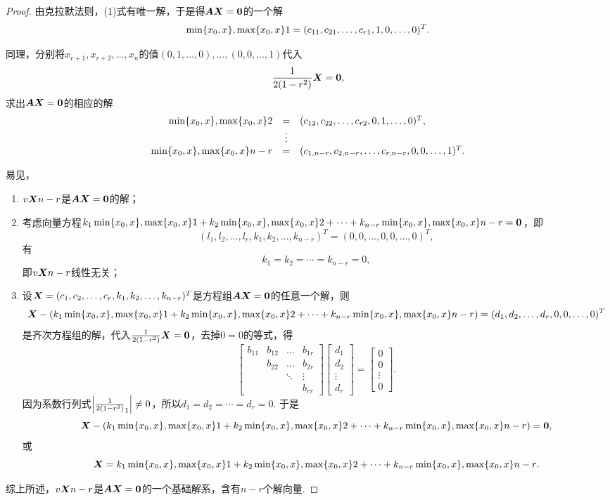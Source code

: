 \begin{theorem}
\begin{proof}
由克拉默法则，(1)式有唯一解，于是得\(\A\x=\z\)的一个解\[
\X1 = (c_{11},c_{21},\dotsc,c_{r1},1,0,\dotsc,0)^T.
\]

同理，分别将\(x_{r+1},x_{r+2},\dotsc,x_n\)的值\((0,1,\dotsc,0),\dotsc,(0,0,\dotsc,1)\)代入\[
\B \x = \z,
\]求出\(\A\x=\z\)的相应的解\[
\begin{array}{rcl}
\X2 &=& (c_{12},c_{22},\dotsc,c_{r2},0,1,\dotsc,0)^T, \\
&\vdots& \\
\X{n-r} &=& (c_{1,n-r},c_{2,n-r},\dotsc,c_{r,n-r},0,0,\dotsc,1)^T.
\end{array}
\]

易见，\begin{enumerate}
\item \(\v{\x}{n-r}\)是\(\A\x=\z\)的解；

\item 考虑向量方程\(k_1 \X1 + k_2 \X2 + \dotsb + k_{n-r} \X{n-r} = \z\)，即\[
(l_1,l_2,\dotsc,l_r,k_1,k_2,\dotsc,k_{n-r})^T
= (0,0,\dotsc,0,0,\dotsc,0)^T,
\]有\[
k_1 = k_2 = \dotsb = k_{n-r} = 0,
\]即\(\v{\x}{n-r}\)线性无关；

\item 设\(\x = (c_1,c_2,\dotsc,c_r,k_1,k_2,\dotsc,k_{n-r})^T\)是方程组\(\A\x=\z\)的任意一个解，则\[
\x - (k_1 \X1 + k_2 \X2 + \dotsb + k_{n-r} \X{n-r})
= (d_1,d_2,\dotsc,d_r,0,0,\dotsc,0)^T
\]是齐次方程组的解，代入\(\B\x=\z\)，去掉\(0 = 0\)的等式，得\[
\begin{bmatrix}
b_{11} & b_{12} & \dots & b_{1r} \\
& b_{22} & \dots & b_{2r} \\
& & \ddots & \vdots \\
& & & b_{rr}
\end{bmatrix}
\begin{bmatrix}
d_1 \\ d_2 \\ \vdots \\ d_r
\end{bmatrix} = \begin{bmatrix}
0 \\ 0 \\ \vdots \\ 0
\end{bmatrix}.
\]因为系数行列式\(\abs{\B_1} \neq 0\)，所以\(d_1 = d_2 = \dotsb = d_r = 0\).
于是\[
\x - (k_1 \X1 + k_2 \X2 + \dotsb + k_{n-r} \X{n-r}) = \z,
\]或\[
\x = k_1 \X1 + k_2 \X2 + \dotsb + k_{n-r} \X{n-r}.
\]
\end{enumerate}

综上所述，\(\v{\x}{n-r}\)是\(\A\x=\z\)的一个基础解系，含有\(n-r\)个解向量.
\end{proof}
\end{theorem}

